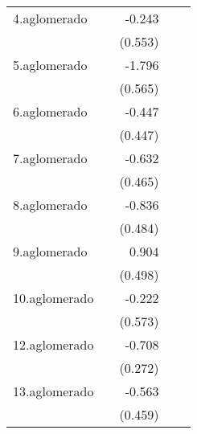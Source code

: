 {\begin{longtable}{l*{4}{D{.}{.}{-1}}}
\addlinespace
4.aglomerado&                     &      -0.243         &                     &                     \\
            &                     &     (0.553)         &                     &                     \\
\addlinespace
5.aglomerado&                     &      -1.796\sym{**} &                     &                     \\
            &                     &     (0.565)         &                     &                     \\
\addlinespace
6.aglomerado&                     &      -0.447         &                     &                     \\
            &                     &     (0.447)         &                     &                     \\
\addlinespace
7.aglomerado&                     &      -0.632         &                     &                     \\
            &                     &     (0.465)         &                     &                     \\
\addlinespace
8.aglomerado&                     &      -0.836         &                     &                     \\
            &                     &     (0.484)         &                     &                     \\
\addlinespace
9.aglomerado&                     &       0.904         &                     &                     \\
            &                     &     (0.498)         &                     &                     \\
\addlinespace
10.aglomerado&                     &      -0.222         &                     &                     \\
            &                     &     (0.573)         &                     &                     \\
\addlinespace
12.aglomerado&                     &      -0.708\sym{**} &                     &                     \\
            &                     &     (0.272)         &                     &                     \\
\addlinespace
13.aglomerado&                     &      -0.563         &                     &                     \\
            &                     &     (0.459)         &                     &                     \\

\end{longtable}}
